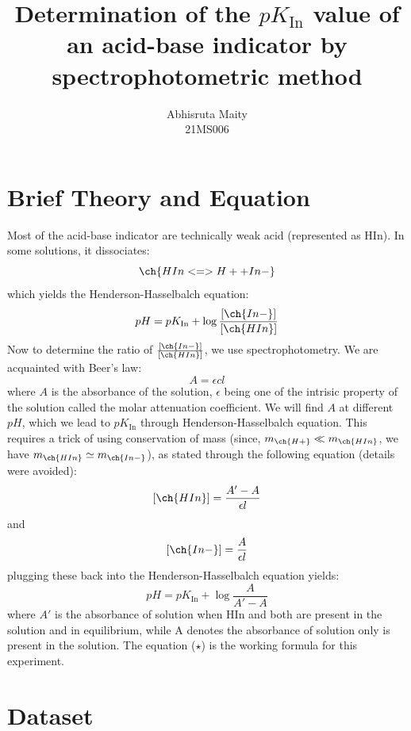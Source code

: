 \documentclass[11pt, a4paper, abstract=true]{scrartcl}
\begin{document}
\subject{
    CH1202: Lab Report III
}
\title{
    \huge Determination of the \(pK_{\text{In}}\) value of an acid-base indicator by spectrophotometric method
}
\author{
    Abhisruta Maity \\
    {\normalsize 21MS006}
}
\date{}
\publishers{
    \normalsize \emph{Indian Institute of Science Education and Research, Kolkata \\
    Mohanpur, West Bengal, 741246, India}
}
\maketitle

\tableofcontents

\section{Brief Theory and Equation}

Most of the acid-base indicator are technically weak acid (represented as HIn). In some solutions, it dissociates: \[\ch{HIn <=> H+ + In-}\] which yields the Henderson-Hasselbalch equation: \[pH = pK_{\text{In}} + \log{\frac{[\ch{In-}]}{[\ch{HIn}]}}\] Now to determine the ratio of \(\frac{[\ch{In-}]}{[\ch{HIn}]}\), we use spectrophotometry. We are acquainted with Beer's law: \[A = \epsilon cl\] where \(A\) is the absorbance of the solution, \(\epsilon\) being one of the intrisic property of the solution called the molar attenuation coefficient. We will find \(A\) at different \(pH\), which we lead to \(pK_\text{In}\) through Henderson-Hasselbalch equation. This requires a trick of using conservation of mass (since, \(m_{\ch{H+}} \ll m_{\ch{HIn}}\), we have \(m_{\ch{HIn}} \simeq m_{\ch{In-}}\)), as stated through the following equation (details were avoided): \[[\ch{HIn}] = \frac{A' - A}{\epsilon l}\] and \[[\ch{In-}] = \frac{A}{\epsilon l}\] plugging these back into the Henderson-Hasselbalch equation yields: \[pH = pK_{\text{In}} + \log{\frac{A}{A' - A}} \tag{\(\star\)}\] where \(A'\) is the absorbance of solution when HIn and  both are present in the solution and in equilibrium, while A denotes the absorbance of solution only  is present in the solution. The equation (\(\star\)) is the working formula for this experiment.

\section{Dataset}
\end{document}
